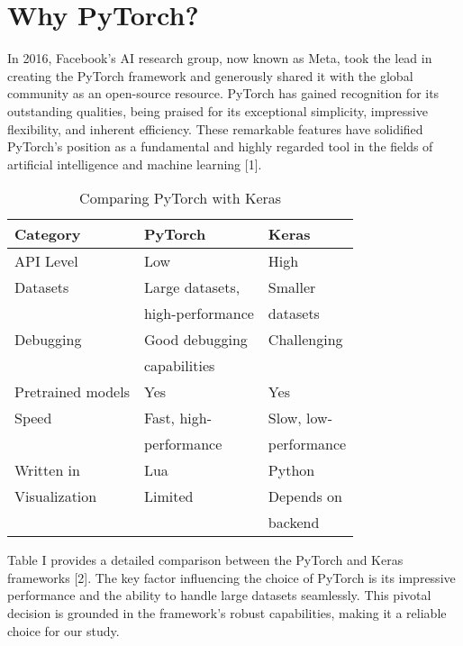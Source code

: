 ﻿\section{Why PyTorch?}
In 2016, Facebook's AI research group, now known as Meta, took the lead in creating the PyTorch framework and generously shared it with the global community as an open-source resource.
PyTorch has gained recognition for its outstanding qualities, being praised for its exceptional simplicity, impressive flexibility, and inherent efficiency.
These remarkable features have solidified PyTorch's position as a fundamental and highly regarded tool in the fields of artificial intelligence and machine learning [1].

\begin{table}[H]
    \begin{center}
    \label{tab1}
    \caption{Comparing PyTorch with Keras}
    \small
        \begin{tabularx}{\columnwidth}{| X | X | X |}
            \hline
            Category & PyTorch & Keras \\
            \hline
            API Level & Low & High \\
            \hline
            Datasets & Large datasets, & Smaller \\
             & high-performance & datasets \\
            \hline
            Debugging & Good debugging & Challenging \\
             & capabilities & \\
            \hline
            Pretrained models & Yes & Yes \\
            \hline
            Speed & Fast, high- & Slow, low- \\
             & performance & performance \\
            \hline
            Written in & Lua & Python \\
            \hline
            Visualization & Limited & Depends on \\
            & & backend \\
            \hline
        \end{tabularx}
    \end{center}
\end{table}

Table I provides a detailed comparison between the PyTorch and Keras frameworks [2].
The key factor influencing the choice of PyTorch is its impressive performance and the ability to handle large datasets seamlessly.
This pivotal decision is grounded in the framework's robust capabilities, making it a reliable choice for our study.